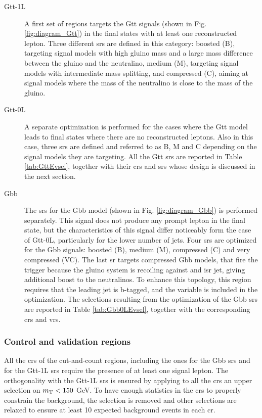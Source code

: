 \begin{description}

\item[Gtt-1L] A first set of regions targets the Gtt signals (shown in Fig. \ref{fig:diagram_Gtt}) in the final states with at least one reconstructed lepton. Three different \glspl{sr} are defined in this category: boosted (B), targeting signal models with high gluino mass 
and a large mass difference between the gluino and the neutralino, medium (M), targeting signal models with intermediate mass splitting, and compressed (C), aiming at signal models where the mass of the neutralino is close to the mass of the gluino. 

\item[Gtt-0L] A separate optimization is performed for the cases where the Gtt model leads to final states where there are no reconstructed leptons.
Also in this case, three \glspl{sr} are defined and referred to as B, M and C depending on the signal models they are targeting. 
All the Gtt \glspl{sr} are reported in Table \ref{tab:GttEvsel}, together with their \glspl{cr} and \glspl{sr} whose design is discussed in the next section. 

\item[Gbb] The \glspl{sr} for the Gbb model (shown in Fig. \ref{fig:diagram_Gbb}) is performed separately. 
This signal does not produce any prompt lepton in the final state, but the characteristics of this signal differ noticeably form 
the case of Gtt-0L, particularly for the lower number of jets. 
Four \glspl{sr} are optimized for the Gbb signals: boosted (B), medium (M), compressed (C) and very compressed (VC). 
The last \gls{sr} targets compressed Gbb models, that fire the \met trigger because the gluino system is recoiling against 
and \gls{isr} jet, giving additional boost to the neutralinos. To enhance this topology, this region requires that the leading jet is b-tagged, and 
the variable \dphilead is included in the optimization. The selections resulting from the optimization of the Gbb \glspl{sr} are 
reported in Table \ref{tab:Gbb0LEvsel}, together with the corresponding \glspl{cr} and \glspl{vr}.

\end{description}

\subsubsection*{Control and validation regions}

All the \glspl{cr} of the cut-and-count regions, including the ones for the Gbb \glspl{sr} and for the Gtt-1L \glspl{sr}
require the presence of at least one signal lepton. 
The orthogonality with the Gtt-1L \glspl{sr} is ensured by applying to all the \glspl{cr} an upper selection on $m_\mathrm{T} < 150$ GeV.
To have enough statistics in the \glspl{cr} to properly constrain the \ttbar background, the 
\mtb selection is removed and other selections are relaxed to ensure at least 10 expected background events in each \gls{cr}.

